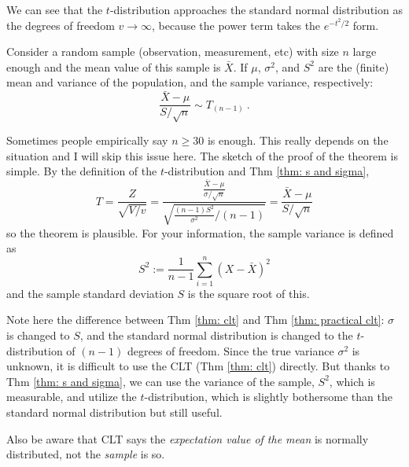 We can see that the $ t $-distribution approaches the standard normal distribution as the degrees of freedom $ v \rightarrow \infty $, because the power term takes the $ e^{-t^2 / 2} $ form. 


\begin{thm} \label{thm: practical clt}
  Consider a random sample (observation, measurement, etc) with size $ n $ large enough and the mean value of this sample is $ \bar{X} $. If $ \mu $, $ \sigma^2 $, and $ S^2 $ are the (finite) mean and variance of the population, and the sample variance, respectively:
  \begin{equation}
    \frac{\bar{X} - \mu}{S / \sqrt{{n}}} \sim T_{(n - 1)} ~.
  \end{equation}
\end{thm}

Sometimes people empirically say $ n \ge 30 $ is enough. This really depends on the situation and I will skip this issue here. The sketch of the proof of the theorem is simple. By the definition of the $ t $-distribution and Thm \ref{thm: s and sigma}, 
\begin{equation}
  T = \frac{Z}{\sqrt{V /v}} = \frac{ \frac{\bar{X} - \mu}{\sigma / \sqrt{n}} }
  {\sqrt{ \frac{(n - 1) S^2}{\sigma^2 } / (n-1)}}
  = \frac{\bar{X} - \mu}{S / \sqrt{{n}}}
\end{equation}
so the theorem is plausible. For your information, the sample variance is defined as
\begin{equation}
  S^2 := \frac{1}{n - 1} \sum_{i=1}^{n} (X - \bar{X})^2 
\end{equation}
and the sample standard deviation $ S $ is the square root of this.

Note here the difference between Thm \ref{thm: clt} and Thm \ref{thm: practical clt}: $ \sigma $ is changed to $ S $, and the standard normal distribution is changed to the $ t $-distribution of $ (n - 1) $ degrees of freedom. Since the true variance $ \sigma^2 $ is unknown, it is difficult to use the CLT (Thm \ref{thm: clt}) directly. But thanks to Thm \ref{thm: s and sigma}, we can use the variance of the sample, $ S^2 $, which is measurable, and utilize the $ t $-distribution, which is slightly bothersome than the standard normal distribution but still useful. 

Also be aware that CLT says the \textit{expectation value of the mean} is normally distributed, not the \textit{sample} is so.

